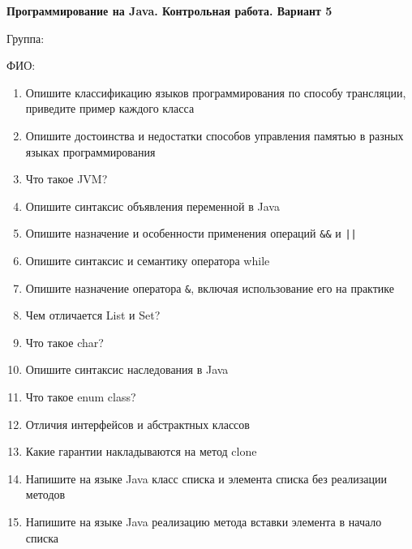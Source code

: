 \documentclass[12pt]{article}
\begin{document}
\newpage\begin{minipage}{\textwidth}
\textbf{Программирование на Java. Контрольная работа. Вариант 5}

Группа: \underline{\hspace{3cm}}

ФИО: \underline{\hspace{10cm}}

\begin{enumerate}
\item Опишите классификацию языков программирования по способу трансляции, приведите пример каждого класса
\item Опишите достоинства и недостатки способов управления памятью в разных языках программирования
\item Что такое JVM?
\item Опишите синтаксис объявления переменной в Java
\item Опишите назначение и особенности применения операций \verb|&&| и \verb!||!
\item Опишите синтаксис и семантику оператора while
\item Опишите назначение оператора \verb|&|, включая использование его на практике
\item Чем отличается List и Set?
\item Что такое char?
\item Опишите синтаксис наследования в Java
\item Что такое enum class?
\item Отличия интерфейсов и абстрактных классов
\item Какие гарантии накладываются на метод clone
\item Напишите на языке Java класс списка и элемента списка без реализации методов
\item Напишите на языке Java реализацию метода вставки элемента в начало списка

\end{enumerate}
\end{minipage}
\end{document}
